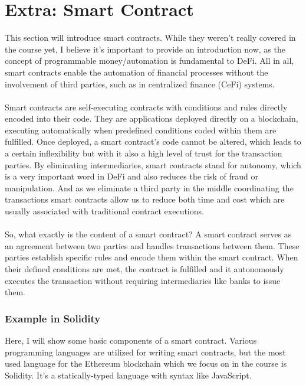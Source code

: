\documentclass{article}
\begin{document}
\section{Extra: Smart Contract} 
This section will introduce smart contracts. While they weren't really covered in the course yet, I believe it's important to provide an introduction now, as the concept of programmable money/automation is fundamental to DeFi. All in all, smart contracts enable the automation of financial processes without the involvement of third parties, such as in centralized finance (CeFi) systems.\\ \\
Smart contracts are  self-executing contracts with conditions and rules directly encoded into their code. They are applications deployed directly on a blockchain, executing automatically when predefined conditions coded within them are fulfilled. Once deployed, a smart contract's code cannot be altered, which leads to a certain inflexibility but with it also a high level of trust for the transaction parties. By eliminating intermediaries, smart contracts stand for autonomy, which is a very important word in DeFi and also reduces the risk of fraud or manipulation. And as we eliminate a third party in the middle coordinating the transactions smart contracts allow us to reduce both time and cost which are usually associated with traditional contract executions.\\
\\
So, what exactly is the content of a smart contract? A smart contract serves as an agreement between two parties and handles transactions between them. These parties establish specific rules and encode them within the smart contract. When their defined conditions are met, the contract is fulfilled and it autonomously executes the transaction without requiring intermediaries like banks to issue them.

\subsubsection{Example in Solidity}%
Here, I will show some basic components of a smart contract. Various programming languages are utilized for writing smart contracts, but the most used language for the Ethereum blockchain which we focus on in the course is Solidity. It's a statically-typed language with syntax like JavaScript.
\end{document}
